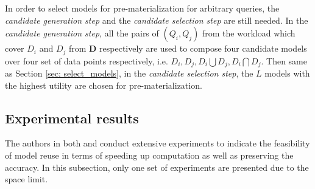 In order to select models for pre-materialization for arbitrary queries, the {\em candidate generation step} and the {\em candidate selection step} are still needed. In the {\em candidate generation step}, all the pairs of $(Q_i, Q_j)$ from the workload which cover $D_i$ and $D_j$ from $\textbf{D}$ respectively are used to compose four candidate models over four set of data points respectively, i.e. $D_i, D_j, D_i \bigcup D_j, D_i \bigcap D_j$. Then same as Section \ref{sec: select_models}, in the {\em candidate selection step}, the $L$ models with the highest utility are chosen for pre-materialization.

\subsection{Experimental results}

The authors in both \cite{gupta2015processing} and \cite{hasani2018efficient} conduct extensive experiments to indicate the feasibility of model reuse in terms of speeding up computation as well as preserving the accuracy. In this subsection, only one set of experiments are presented due to the space limit.

